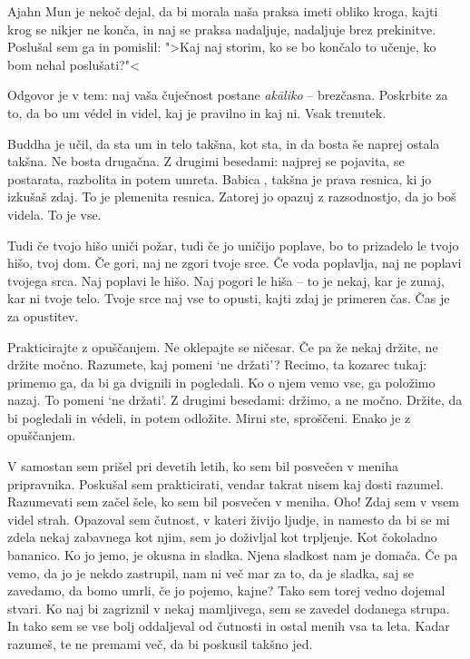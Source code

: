 Ajahn Mun je nekoč dejal, da bi morala naša praksa imeti obliko kroga, kajti krog se nikjer ne konča, in naj se praksa nadaljuje, nadaljuje brez prekinitve. Poslušal sem ga in pomislil: ">Kaj naj storim, ko se bo končalo to učenje, ko bom nehal poslušati?"<

Odgovor je v tem: naj vaša čuječnost postane \emph{akāliko} – brezčasna. Poskrbite za to, da bo um védel in videl, kaj je pravilno in kaj ni. Vsak trenutek.

\clearpage


Buddha je učil, da sta um in telo takšna, kot sta, in da bosta še naprej ostala takšna. Ne bosta drugačna. Z drugimi besedami: najprej se pojavita, se postarata, razbolita in potem umreta. Babica, takšna je prava resnica, ki jo izkušaš zdaj. To je plemenita resnica. Zatorej jo opazuj z razsodnostjo, da jo boš videla. To je vse.

Tudi če tvojo hišo uniči požar, tudi če jo uničijo poplave, bo to prizadelo le tvojo hišo, tvoj dom. Če gori, naj ne zgori tvoje srce. Če voda poplavlja, naj ne poplavi tvojega srca. Naj poplavi le hišo. Naj pogori le hiša – to je nekaj, kar je zunaj, kar ni tvoje telo. Tvoje srce naj vse to opusti, kajti zdaj je primeren čas. Čas je za opustitev.


Prakticirajte z opuščanjem. Ne oklepajte se ničesar. Če pa že nekaj držite, ne držite močno. Razumete, kaj pomeni `ne držati'? Recimo, ta kozarec tukaj: primemo ga, da bi ga dvignili in pogledali. Ko o njem vemo vse, ga položimo nazaj. To pomeni `ne držati'. Z drugimi besedami: držimo, a ne močno. Držite, da bi pogledali in védeli, in potem odložite. Mirni ste, sproščeni. Enako je z opuščanjem.

\clearpage


V samostan sem prišel pri devetih letih, ko sem bil posvečen v meniha pripravnika. Poskušal sem prakticirati, vendar takrat nisem kaj dosti razumel. Razumevati sem začel šele, ko sem bil posvečen v meniha. Oho! Zdaj sem v vsem videl strah. Opazoval sem čutnost, v kateri živijo ljudje, in namesto da bi se mi zdela nekaj zabavnega kot njim, sem jo doživljal kot trpljenje. Kot čokoladno bananico. Ko jo jemo, je okusna in sladka. Njena sladkost nam je domača. Če pa vemo, da jo je nekdo zastrupil, nam ni več mar za to, da je sladka, saj se zavedamo, da bomo umrli, če jo pojemo, kajne? Tako sem torej vedno dojemal stvari. Ko naj bi zagriznil v nekaj mamljivega, sem se zavedel dodanega strupa. In tako sem se vse bolj oddaljeval od čutnosti in ostal menih vsa ta leta. Kadar razumeš, te ne premami več, da bi poskusil takšno jed.

